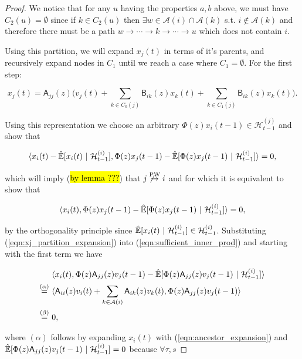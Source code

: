 \documentclass[12pt]{article}
\def\pwgc{\overset{\text{PW}}{\rightarrow}}  %
\def\B{\mathsf{B}}  %
\def\A{\mathsf{A}}  %
\def\H{\mathcal{H}}  %
\newcommand{\linE}[2]{\hat{\E}[#1\ |\ #2]}  %
\newcommand{\anc}[1]{\mathcal{A}(#1)}  %
\begin{document}
\begin{proof}
  We notice that for any $u$ having the properties $a, b$ above, we must have $C_2(u) = \emptyset$ since if $k \in C_2(u)$ then $\exists w \in \anc{i} \cap \anc{k}$ s.t. $i \not \in \anc{k}$ and therefore there must be a path $w \rightarrow \cdots \rightarrow k \rightarrow \cdots \rightarrow u$ which does not contain $i$.

  Using this partition, we will expand $x_j(t)$ in terms of it's parents, and recursively expand nodes in $C_1$ until we reach a case where $C_1 = \emptyset$.  For the first step:  %

  \begin{equation}
    \label{eqn:xj_partition_expansion}
    x_j(t) = \A_{jj}(z)\Big(v_j(t) + \sum_{k \in C_0(j)}\B_{ik}(z)x_k(t) + \sum_{k \in C_1(j)}\B_{ik}(z)x_k(t)\Big).
  \end{equation}

  Using this representation we choose an arbitrary $\Phi(z) x_i(t - 1) \in \H_{t - 1}^{(j)}$ and show that

  \begin{equation}
    \inner{x_i(t) - \linE{x_i(t)}{\H_{t - 1}^{(i)}}}{\Phi(z)x_j(t - 1) - \linE{\Phi(z)x_j(t - 1)}{\H_{t - 1}^{(i)}}} = 0,
  \end{equation}

  which will imply (\hl{by lemma ???}) that $j \not\pwgc i$ and for which it is equivalent to show that

  \begin{equation}
    \label{eqn:sufficient_inner_prod}
    \inner{x_i(t)}{\Phi(z)x_j(t - 1) - \linE{\Phi(z)x_j(t - 1)}{\H_{t - 1}^{(i)}}} = 0,
  \end{equation}

  by the orthogonality principle since $\linE{x_i(t)}{\H_{t - 1}^{(i)}} \in \H_{t - 1}^{(i)}$.  Substituting (\ref{eqn:xj_partition_expansion}) into (\ref{eqn:sufficient_inner_prod}) and starting with the first term we have

  \begin{align*}
    &\inner{x_i(t)}{\Phi(z)\A_{jj}(z)v_j(t - 1) - \linE{\Phi(z)\A_{jj}(z)v_j(t - 1)}{\H_{t - 1}^{(i)}}}\\
    \overset{(\alpha)}{=}\ &\inner{\A_{ii}(z)v_i(t) + \sum_{k \in \anc{i}}\A_{ik}(z)v_k(t)}{\Phi(z)\A_{jj}(z)v_j(t - 1)}\\
    \overset{(\beta)}{=}\ &0,
  \end{align*}

  where $(\alpha)$ follows by expanding $x_i(t)$ with (\ref{eqn:ancestor_expansion}) and $\linE{\Phi(z)\A_{jj}(z)v_j(t - 1)}{\H_{t - 1}^{(i)}} = 0$ because $\forall \tau, s$


\end{proof}
\end{document}
